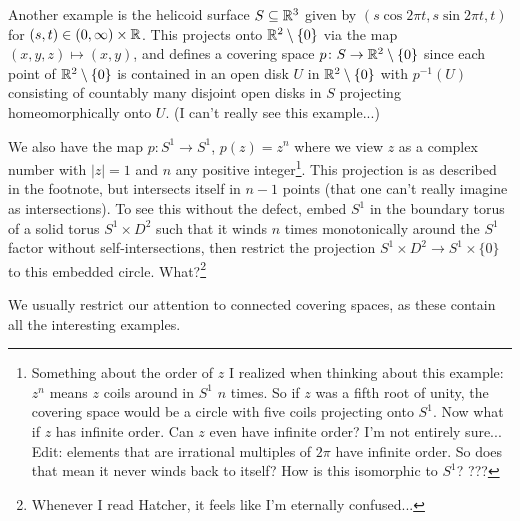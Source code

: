 \begin{example}
    Another example is the helicoid surface $S\subseteq \mathbb{R}^3$ given by $(s \cos 2\pi t, s \sin 2\pi t, t)$ for $(s,t)\in (0,\infty)\times \mathbb{R}$. This projects onto $\mathbb{R}^2\setminus \{0\} $ via the map $(x,y,z) \mapsto (x,y)$, and defines a covering space $p \colon S \to \mathbb{R}^2\setminus \{0\} $ since each point of $\mathbb{R}^2\setminus \{0\} $ is contained in an open disk $U$ in $\mathbb{R}^2\setminus \{0\} $ with $p ^{-1}(U)$ consisting of countably many disjoint open disks in $S$ projecting homeomorphically onto $U$. (I can't really see this example...)
\end{example}
\begin{example}
    We also have the map $p \colon S^{1}  \to S^{1} $, $p(z)=z^n$ where we view $z$ as a complex number with $|z|=1$ and $n$ any positive integer\footnote{Something about the order of $z$ I realized when thinking about this example: $z^n$ means $z$ coils around in $S^{1} $ $n$ times. So if $z$ was a fifth root of unity, the covering space would be a circle with five coils projecting onto $S^{1} $. Now what if $z$ has infinite order. Can $z$ even have infinite order? I'm not entirely sure...\\Edit: elements that are irrational multiples of $2\pi$ have infinite order. So does that mean it never winds back to itself? How is this isomorphic to $S^{1} $? ???}. This projection is as described in the footnote, but intersects itself in $n-1$ points (that one can't really imagine as intersections). To see this without the defect, embed $S^{1} $ in the boundary torus of a solid torus $S^{1} \times D^2$ such that it winds $n$ times monotonically around the $S^{1}$ factor without self-intersections, then restrict the projection $S^{1} \times D^2 \to S^{1} \times \{0\} $ to this embedded circle. What?\footnote{Whenever I read Hatcher, it feels like I'm eternally confused...}
\end{example}

We usually restrict our attention to connected covering spaces, as these contain all the interesting examples.


